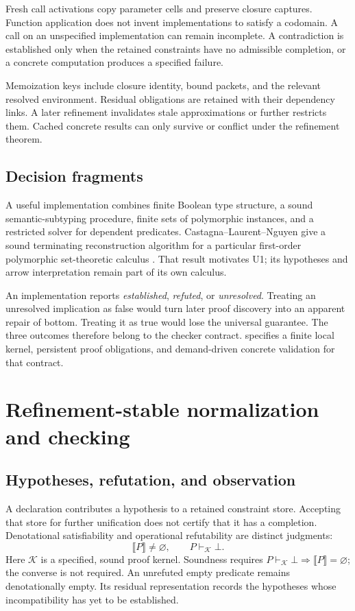 \documentclass[11pt,a4paper,oneside]{report}
\newcommand{\sem}[1]{\llbracket #1\rrbracket}
\newcommand{\Uone}{\ensuremath{\profilecal{U}_{1}}}
\def\Uone{U1}%
\theoremstyle{remark}
\begin{document}
Fresh call activations copy parameter cells and preserve closure captures.
Function application does not invent implementations to satisfy a codomain.
A call on an unspecified implementation can remain incomplete. A contradiction
is established only when the retained constraints have no admissible completion,
or a concrete computation produces a specified failure.

Memoization keys include closure identity, bound packets, and the relevant
resolved environment. Residual obligations are retained with their dependency
links. A later refinement invalidates stale approximations or further restricts
them. Cached concrete results can only survive or conflict under the refinement
theorem.

\section{Decision fragments}
A useful implementation combines finite Boolean type structure, a sound
semantic-subtyping procedure, finite sets of polymorphic instances, and a
restricted solver for dependent predicates. Castagna--Laurent--Nguyen give a
sound terminating reconstruction algorithm for a particular first-order
polymorphic set-theoretic calculus \cite{cln2024}. That result motivates \Uone{};
its hypotheses and arrow interpretation remain part of its own calculus.

An implementation reports \emph{established}, \emph{refuted}, or
\emph{unresolved}. Treating an unresolved implication as false would turn later
proof discovery into an apparent repair of bottom. Treating it as true would
lose the universal guarantee. The three outcomes therefore belong to the
checker contract.  specifies a finite local kernel, persistent
proof obligations, and demand-driven concrete validation for that contract.

\chapter{Refinement-stable normalization and checking}
\label{ch:residual}
\section{Hypotheses, refutation, and observation}
A declaration contributes a hypothesis to a retained constraint store. Accepting
that store for further unification does not certify that it has a completion.
Denotational satisfiability and operational refutability are distinct judgments:
\[
 \sem P\ne\varnothing,
 \qquad P\vdash_{\mathcal K}\bot.
\]
Here $\mathcal K$ is a specified, sound proof kernel. Soundness requires
$P\vdash_{\mathcal K}\bot\Longrightarrow\sem P=\varnothing$; the converse
is not required. An unrefuted empty predicate remains denotationally empty.
Its residual representation records the hypotheses whose incompatibility has
yet to be established.
\end{document}
